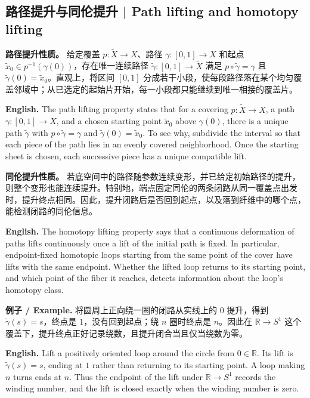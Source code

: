 \documentclass[UTF8,11pt,a4paper]{ctexart}
\newcommand{\EN}[1]{\par\noindent\textbf{English.} #1\par}
\newcommand{\EX}[2]{\par\noindent\textbf{例子 / Example.} #1\par\EN{#2}}
\begin{document}
\subsection{路径提升与同伦提升 | Path lifting and homotopy lifting}
\noindent\textbf{路径提升性质。} 给定覆盖 $p:\widetilde X\to X$、路径 $\gamma:[0,1]\to X$ 和起点 $\widetilde x_0\in p^{-1}(\gamma(0))$，存在唯一连续路径 $\widetilde\gamma:[0,1]\to\widetilde X$ 满足 $p\circ\widetilde\gamma=\gamma$ 且 $\widetilde\gamma(0)=\widetilde x_0$。直观上，将区间 $[0,1]$ 分成若干小段，使每段路径落在某个均匀覆盖邻域中；从已选定的起始片开始，每一小段都只能继续到唯一相接的覆盖片。
\EN{The path lifting property states that for a covering $p:\widetilde X\to X$, a path $\gamma:[0,1]\to X$, and a chosen starting point $\widetilde x_0$ above $\gamma(0)$, there is a unique path $\widetilde\gamma$ with $p\circ\widetilde\gamma=\gamma$ and $\widetilde\gamma(0)=\widetilde x_0$. To see why, subdivide the interval so that each piece of the path lies in an evenly covered neighborhood. Once the starting sheet is chosen, each successive piece has a unique compatible lift.}
\noindent\textbf{同伦提升性质。} 若底空间中的路径随参数连续变形，并已给定初始路径的提升，则整个变形也能连续提升。特别地，端点固定同伦的两条闭路从同一覆盖点出发时，提升终点相同。因此，提升闭路后是否回到起点，以及落到纤维中的哪个点，能检测闭路的同伦信息。
\EN{The homotopy lifting property says that a continuous deformation of paths lifts continuously once a lift of the initial path is fixed. In particular, endpoint-fixed homotopic loops starting from the same point of the cover have lifts with the same endpoint. Whether the lifted loop returns to its starting point, and which point of the fiber it reaches, detects information about the loop's homotopy class.}
\EX{将圆周上正向绕一圈的闭路从实线上的 $0$ 提升，得到 $\widetilde\gamma(s)=s$，终点是 $1$，没有回到起点；绕 $n$ 圈时终点是 $n$。因此在 $\mathbb R\to S^1$ 这个覆盖下，提升终点正好记录绕数，且提升闭合当且仅当绕数为零。}{Lift a positively oriented loop around the circle from $0\in\mathbb R$. Its lift is $\widetilde\gamma(s)=s$, ending at $1$ rather than returning to its starting point. A loop making $n$ turns ends at $n$. Thus the endpoint of the lift under $\mathbb R\to S^1$ records the winding number, and the lift is closed exactly when the winding number is zero.}
\end{document}
